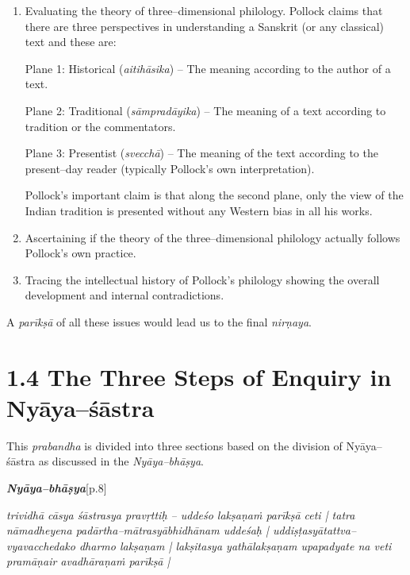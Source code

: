 \begin{enumerate}
\itemsep=0pt
\item 
 Evaluating the theory of three–dimensional philology. Pollock claims that there are three perspectives in understanding a Sanskrit (or any classical) text and these are:

\begin{myquote}
Plane 1: Historical (\textit{aitihāsika}) – The meaning according to the author of a text.
\end{myquote}

\begin{myquote}
Plane 2: Traditional (\textit{sāmpradāyika}) – The meaning of a text according to tradition or the commentators.
\end{myquote}

\begin{myquote}
Plane 3: Presentist (\textit{svecchā}) – The meaning of the text according to the present–day reader (typically Pollock’s own interpretation).
\end{myquote}

 Pollock’s important claim is that along the second plane, only the view of the Indian tradition is presented without any Western bias in all his works.

 \item Ascertaining if the theory of the three–dimensional philology actually follows Pollock’s own practice.

 \item Tracing the intellectual history of Pollock’s philology showing the overall development and internal contradictions.

\end{enumerate}

A \textit{parīkṣā} of all these issues would lead us to the final \textit{nirṇaya}.


\section*{1.4 The Three Steps of Enquiry in Nyāya–śāstra}

This \textit{prabandha} is divided into three sections based on the division of Nyāya–śāstra as discussed in the \textit{Nyāya–bhāṣya}.

\textit{\textbf{Nyāya–bhāṣya}}[p.8]

\begin{myquote}
\textit{trividhā cāsya śāstrasya pravṛttiḥ – uddeśo lakṣaṇaṁ parīkṣā ceti | tatra nāmadheyena padārtha–mātrasyābhidhānam uddeśaḥ | uddiṣṭasyātattva–vyavacchedako dharmo lakṣaṇam | lakṣitasya yathālakṣaṇam upapadyate na veti pramāṇair avadhāraṇaṁ parīkṣā |}
\end{myquote}

